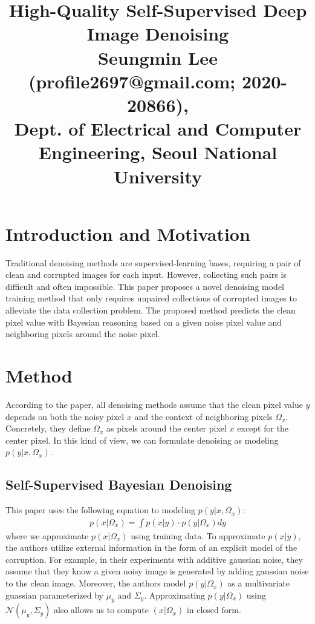 \documentclass[10pt,twocolumn,letterpaper]{article}
\begin{document}
\title{High-Quality Self-Supervised Deep Image Denoising\\ {\rm {\normalsize Seungmin Lee (profile2697@gmail.com; 2020-20866), \\Dept. of Electrical and Computer Engineering, Seoul National University}}}   %

\maketitle
\thispagestyle{empty}

\section{Introduction and Motivation}
Traditional denoising methods are supervised-learning bases, requiring a pair of clean and corrupted images for each input. However, collecting such pairs is difficult and often impossible. This paper proposes a novel denoising model training method that only requires unpaired collections of corrupted images to alleviate the data collection problem. 
The proposed method predicts the clean pixel value with Bayesian reasoning based on a given noise pixel value and neighboring pixels around the noise pixel.


\section{Method}
According to the paper, all denoising methods assume that the clean pixel value $y$ depends on both the noisy pixel $x$ and the context of neighboring pixels $\Omega_x$. Concretely, they define $\Omega_x$ as pixels around the center pixel $x$ except for the center pixel.
In this kind of view, we can formulate denoising as modeling $p(y | x, \Omega_x)$. 

\subsection{Self-Supervised Bayesian Denoising}
This paper uses the following equation to modeling $p(y | x, \Omega_x)$:
\begin{align*}
	p(x | \Omega_x) = \int{p(x | y) \cdot p(y | \Omega_x)dy}
\end{align*}
where we approximate $p(x | \Omega_x)$ using training data. To approximate $p(x | y)$, the authors utilize external information in the form of an explicit model of the corruption. For example, in their experiments with additive gaussian noise, they assume that they know a given noisy image is generated by adding gaussian noise to the clean image. Moreover, the authors model $p(y | \Omega_x)$ as a multivariate guassian parameterized by $\mu_y$ and $\Sigma_y$. Approximating $p(y | \Omega_x)$ using $\mathcal{N}(\mu_y, \Sigma_y)$ also allows us to compute $(x | \Omega_x)$ in closed form.
\end{document}
